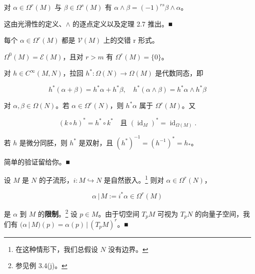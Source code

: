 \begin{remark}
\begin{items}
\begin{subitems}
\item

对 $ \alpha\in\Omega^{r}(M) $ 与 $ \beta\in\Omega^{s}(M) $ 有 $ \alpha\wedge\beta = (-1)^{rs}\beta\wedge\alpha $。

\proofhead
这由光滑性的定义、$ \wedge $ 的逐点定义以及定理 2.7 推出。\nobreak\hspace{0.35em}■
\end{subitems}

\item

每个 $ \alpha\in\Omega^{r}(M) $ 都是 $ \mathcal{V}(M) $ 上的交错 r 形式。

\item

$ \Omega^{0}(M) = \mathcal{E}(M) $，且对 $ r>m $ 有 $ \Omega^{r}(M) = \{0\} $。

\item

对 $ h\in C^{\infty}(M,N) $，拉回 $ h^{\ast} : \Omega(N)\to\Omega(M) $ 是代数同态，即

\[
h^{\ast}(\alpha+\beta) = h^{\ast}\alpha+h^{\ast}\beta, \quad h^{\ast}(\alpha\wedge\beta) = h^{\ast}\alpha\wedge h^{\ast}\beta
\]

对 $ \alpha,\beta\in\Omega(N) $。若 $ \alpha\in\Omega^{r}(N) $，则 $ h^{\ast}\alpha $ 属于 $ \Omega^{r}(M) $。又

\[
(k\circ h)^{\ast} = h^{\ast}\circ k^{\ast} \quad \text{且 } (\operatorname{id}_{M})^{\ast} = \operatorname{id}_{\Omega(M)}.
\]

若 $ h $ 是微分同胚，则 $ h^{\ast} $ 是双射，且 $ (h^{\ast})^{-1} = (h^{-1})^{\ast} = h_{\ast} $。

\proofhead
简单的验证留给你。\nobreak\hspace{0.35em}■
\item

设 $ M $ 是 $ N $ 的子流形，$ i : M\hookrightarrow N $ 是自然嵌入。\footnote{在这种情形下，我们总假设 $ N $ 没有边界。} 则对 $ \alpha\in\Omega^{r}(N) $，

\[
\alpha\,|\,M := i^{\ast}\alpha\in\Omega^{r}(M)
\]

是 $ \alpha $ 到 $ M $ 的\textbf{限制}。\footnote{参见例 3.4(j)。} 设 $ p\in M $。由于切空间 $ T_{p}M $ 可视为 $ T_{p}N $ 的向量子空间，我们有 $ (\alpha\,|\,M)(p) = \alpha(p)\,|\,(T_{p}M)^{r} $。\nobreak\hspace{0.35em}■

\end{items}

\end{remark}

